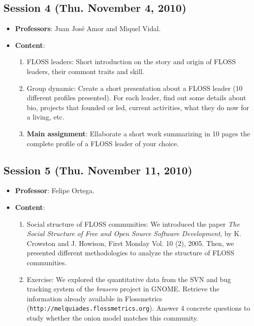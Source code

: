 \documentclass[a4paper]{article}
\begin{document}
\subsection{Session 4 (Thu. November 4, 2010)}

\begin{itemize}
 \item \textbf{Professors}: Juan José Amor and Miquel Vidal.

  \item \textbf{Content}:

  \begin{enumerate}
   \item FLOSS leaders: Short introduction on the story and origin of FLOSS leaders, their commont traits and skill.

   \item Group dynamic: Create a short presentation about a FLOSS leader (10 different profiles presented). For each leader, find out some
details about bio, projects that founded or led, current activities, what they do now for a living, etc.

   \item \textbf{Main assignment}: Ellaborate a short work summarizing in 10 pages the complete profile of a FLOSS leader of your choice.
  \end{enumerate}

\end{itemize}

\subsection{Session 5 (Thu. November 11, 2010)}

\begin{itemize}
 \item \textbf{Professor}: Felipe Ortega.

 \item \textbf{Content}:

 \begin{enumerate}
  \item Social structure of FLOSS communities: We introduced the paper \textit{The Social Structure of Free and Open Source Software Development}, by
K. Crowston and J. Howison, First Monday Vol. 10 (2), 2005. Then, we presented different methodologies to analyze the structure of FLOSS communities.

  \item Exercise: We explored the quantitative data from the SVN and bug tracking system of the \textit{brasero} project in GNOME. Retrieve the information
already available in Flossmetrics (\texttt{http://melquiades.flossmetrics.org}). Answer 4 concrete questions to study whether the onion model matches this community.
 \end{enumerate}

\end{itemize}
\end{document}
